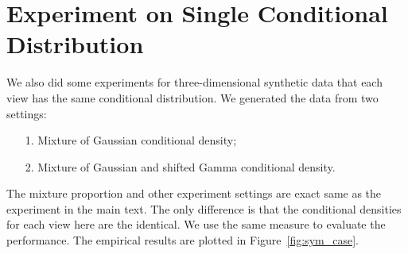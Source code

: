 
\section{Experiment on Single Conditional Distribution}

We also did some experiments for three-dimensional synthetic data that each view has the same conditional distribution. We generated the data from two settings:
\begin{itemize}
\item[1.] Mixture of Gaussian conditional density;
\item[2.] Mixture of Gaussian and shifted Gamma conditional density.
\end{itemize}
The mixture proportion and other experiment settings are exact same as the experiment in the main text. The only difference is that the conditional densities for each view here are the identical. We use the same measure to evaluate the performance. The empirical results are plotted in Figure~\ref{fig:sym_case}.

